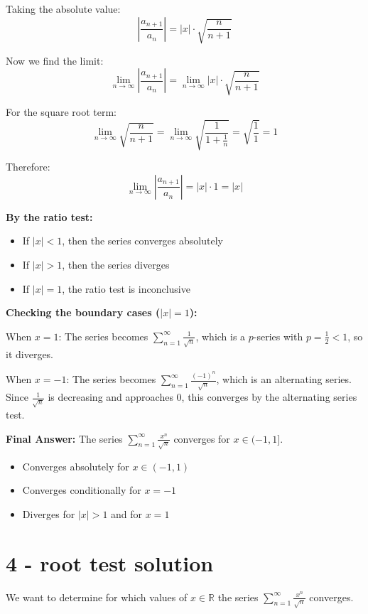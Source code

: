 \documentclass[12pt,a4paper]{article}
\theoremstyle{definition}
\theoremstyle{remark}
\begin{document}
Taking the absolute value:
$$\left|\frac{a_{n+1}}{a_n}\right| = |x| \cdot \sqrt{\frac{n}{n+1}}$$

Now we find the limit:
$$\lim_{n \to \infty} \left|\frac{a_{n+1}}{a_n}\right| = \lim_{n \to \infty} |x| \cdot \sqrt{\frac{n}{n+1}}$$

For the square root term:
$$\lim_{n \to \infty} \sqrt{\frac{n}{n+1}} = \lim_{n \to \infty} \sqrt{\frac{1}{1+\frac{1}{n}}} = \sqrt{\frac{1}{1}} = 1$$

Therefore:
$$\lim_{n \to \infty} \left|\frac{a_{n+1}}{a_n}\right| = |x| \cdot 1 = |x|$$

\textbf{By the ratio test:}
\begin{itemize}
    \item If $|x| < 1$, then the series converges absolutely
    \item If $|x| > 1$, then the series diverges
    \item If $|x| = 1$, the ratio test is inconclusive
\end{itemize}

\textbf{Checking the boundary cases ($|x| = 1$):}

When $x = 1$: The series becomes $\sum_{n=1}^{\infty} \frac{1}{\sqrt{n}}$, which is a $p$-series with $p = \frac{1}{2} < 1$, so it diverges.

When $x = -1$: The series becomes $\sum_{n=1}^{\infty} \frac{(-1)^n}{\sqrt{n}}$, which is an alternating series. Since $\frac{1}{\sqrt{n}}$ is decreasing and approaches $0$, this converges by the alternating series test.

\textbf{Final Answer:}
The series $\sum_{n=1}^{\infty} \frac{x^n}{\sqrt{n}}$ converges for $x \in (-1, 1]$.

\begin{itemize}
    \item Converges absolutely for $x \in (-1, 1)$
    \item Converges conditionally for $x = -1$
    \item Diverges for $|x| > 1$ and for $x = 1$
\end{itemize}


\section*{4 - root test solution}
We want to determine for which values of $x \in \mathbb{R}$ the series $\sum_{n=1}^{\infty} \frac{x^n}{\sqrt{n}}$ converges.
\end{document}
